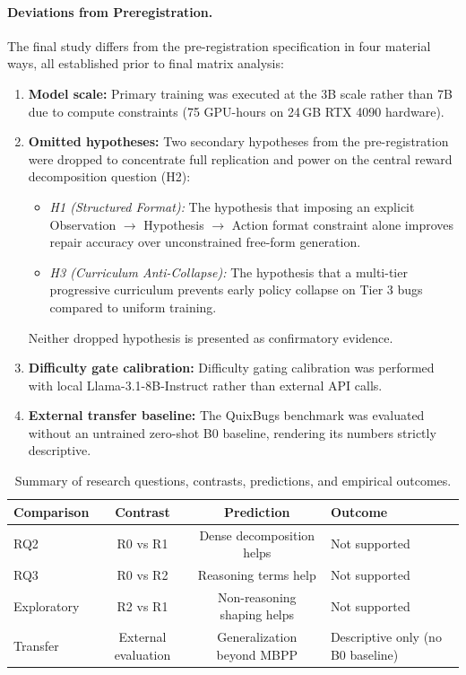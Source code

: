 \documentclass{article}
\begin{document}
\paragraph{Deviations from Preregistration.}
The final study differs from the pre-registration specification in four material ways, all established prior to final matrix analysis:
\begin{enumerate}
\item \textbf{Model scale:} Primary training was executed at the 3B scale rather than 7B due to compute constraints (75 GPU-hours on 24\,GB RTX 4090 hardware).
\item \textbf{Omitted hypotheses:} Two secondary hypotheses from the pre-registration were dropped to concentrate full replication and power on the central reward decomposition question (H2):
\begin{itemize}
\item \textit{H1 (Structured Format):} The hypothesis that imposing an explicit Observation $\to$ Hypothesis $\to$ Action format constraint alone improves repair accuracy over unconstrained free-form generation.
\item \textit{H3 (Curriculum Anti-Collapse):} The hypothesis that a multi-tier progressive curriculum prevents early policy collapse on Tier 3 bugs compared to uniform training.
\end{itemize}
Neither dropped hypothesis is presented as confirmatory evidence.
\item \textbf{Difficulty gate calibration:} Difficulty gating calibration was performed with local Llama-3.1-8B-Instruct rather than external API calls.
\item \textbf{External transfer baseline:} The QuixBugs benchmark was evaluated without an untrained zero-shot B0 baseline, rendering its numbers strictly descriptive.
\end{enumerate}

\begin{table}[t]
\centering
\small
\begin{tabular}{l c c l}
\toprule
\textbf{Comparison} & \textbf{Contrast} & \textbf{Prediction} & \textbf{Outcome} \\
\midrule
RQ2 & R0 vs R1 & Dense decomposition helps & Not supported \\
RQ3 & R0 vs R2 & Reasoning terms help & Not supported \\
Exploratory & R2 vs R1 & Non-reasoning shaping helps & Not supported \\
Transfer & External evaluation & Generalization beyond MBPP & Descriptive only (no B0 baseline) \\
\bottomrule
\end{tabular}
\caption{Summary of research questions, contrasts, predictions, and empirical outcomes.}
\label{tab:hypotheses}
\end{table}
\end{document}
